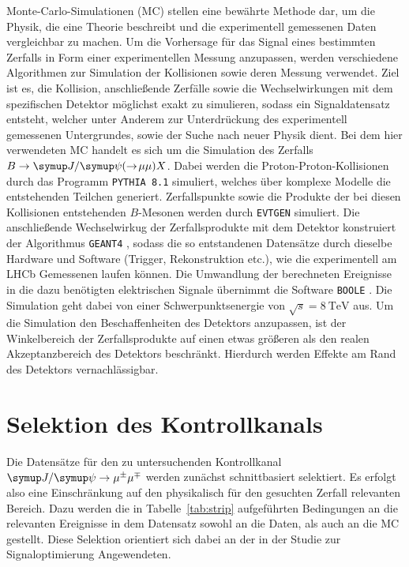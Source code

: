 Monte-Carlo-Simulationen (MC) stellen eine bewährte Methode dar, um die Physik, die eine Theorie beschreibt und die experimentell gemessenen Daten vergleichbar zu machen. Um die Vorhersage für das Signal eines bestimmten Zerfalls in Form einer experimentellen Messung anzupassen, werden verschiedene Algorithmen zur Simulation der Kollisionen sowie deren Messung verwendet. Ziel ist es, die Kollision, anschließende Zerfälle sowie die Wechselwirkungen mit dem spezifischen Detektor möglichst exakt zu simulieren, sodass ein Signaldatensatz entsteht, welcher unter Anderem zur Unterdrückung des experimentell gemessenen Untergrundes, sowie der Suche nach neuer Physik dient. Bei dem hier verwendeten MC handelt es sich um die Simulation des Zerfalls $B\rightarrow\jpsi(\rightarrow\!\mu\mu) X$. Dabei werden die Proton-Proton-Kollisionen durch das Programm \texttt{PYTHIA 8.1} \cite{pythia} simuliert, welches über komplexe Modelle die entstehenden Teilchen generiert. Zerfallspunkte sowie die Produkte der bei diesen Kollisionen entstehenden $B$-Mesonen werden durch \texttt{EVTGEN} \cite{evtgen} simuliert. Die anschließende Wechselwirkug der Zerfallsprodukte mit dem Detektor konstruiert der Algorithmus \texttt{GEANT4}  \cite{geant4}, sodass die so entstandenen Datensätze durch dieselbe Hardware und Software (Trigger, Rekonstruktion etc.), wie die experimentell am LHCb Gemessenen laufen können. Die Umwandlung der berechneten Ereignisse in die dazu benötigten elektrischen Signale übernimmt die Software \texttt{BOOLE} \cite{boole}. Die Simulation geht dabei von einer Schwerpunktsenergie von $\sqrt{s}=\SI{8}{\tera\electronvolt}$ aus. Um die Simulation den Beschaffenheiten des Detektors anzupassen, ist der Winkelbereich der Zerfallsprodukte auf einen etwas größeren als den realen Akzeptanzbereich des Detektors beschränkt. Hierdurch werden Effekte am Rand des Detektors vernachlässigbar.

\section{Selektion des Kontrollkanals}
%
Die Datensätze für den zu untersuchenden Kontrollkanal $\kontroll$ werden zunächst schnittbasiert selektiert. Es erfolgt also eine Einschränkung auf den physikalisch für den gesuchten Zerfall relevanten Bereich. Dazu werden die in Tabelle~\ref{tab:strip} aufgeführten Bedingungen an die relevanten Ereignisse in dem Datensatz sowohl an die Daten, als auch an die MC gestellt. Diese Selektion orientiert sich dabei an der in der Studie zur Signaloptimierung \cite{ba-maik} Angewendeten.


